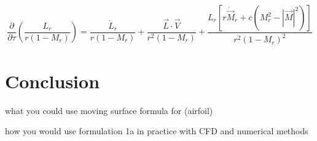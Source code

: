 \documentclass[]{aiaa-tc}%
\begin{document}
\begin{equation} \label{TauDer}
\dfrac{\partial}{\partial \tau} \left( \dfrac{L_r}{r (1 - M_r)}  \right)
= \dfrac{\dot{L}_r}{r (1 - M_r)}
    + \dfrac{\vec{L}\cdot\vec{V}}{r^2 (1 - M_r)}
    + \dfrac{ L_r \left[
        r\dot{\vec{M}}_r + c \left( M_r^2 - |\vec{M}|^2 \right) \right] }
        {r^2 (1 - M_r)^2}
\end{equation}




\section*{Conclusion}

what you could use moving surface formula for (airfoil)

how you would use formulation 1a in practice with CFD and numerical methods
\end{document}
